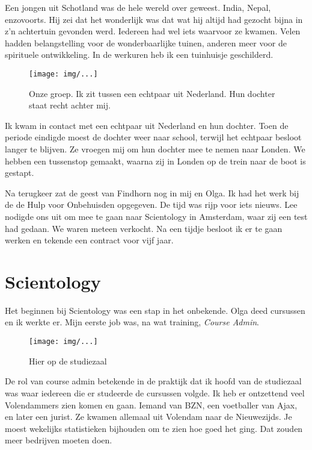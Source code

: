 \documentclass[10pt,twoside,openright]{memoir}
\begin{document}
Een jongen uit Schotland was de hele wereld over geweest. India, Nepal, enzovoorts. Hij zei dat het wonderlijk was dat wat hij altijd had gezocht bijna in z’n achtertuin gevonden werd. Iedereen had wel iets waarvoor ze kwamen. Velen hadden belangstelling voor de wonderbaarlijke tuinen, anderen meer voor de spirituele ontwikkeling. In de werkuren heb ik een tuinhuisje geschilderd. 

\begin{figure}[t]
\texttt{[image: img/...]}
\caption{Onze groep. Ik zit tussen een echtpaar uit Nederland. Hun dochter staat recht achter mij.}
\end{figure}

Ik kwam in contact met een echtpaar uit Nederland en hun dochter. Toen de periode eindigde moest de dochter weer naar school, terwijl het echtpaar besloot langer te blijven. Ze vroegen mij om hun dochter mee te nemen naar Londen. We hebben een tussenstop gemaakt, waarna zij in Londen op de trein naar de boot is gestapt.

Na terugkeer zat de geest van Findhorn nog in mij en Olga. Ik had het werk bij de de Hulp voor Onbehuisden opgegeven. De tijd was rijp voor iets nieuws. Lee nodigde ons uit om mee te gaan naar Scientology in Amsterdam, waar zij een test had gedaan. We waren meteen verkocht. Na een tijdje besloot ik er te gaan werken en tekende een contract voor vijf jaar. 

\chapter{Scientology} %
\label{cha:scientologu}

Het beginnen bij Scientology was een stap in het onbekende. Olga deed cursussen en ik werkte er. Mijn eerste job was, na wat training, \emph{Course Admin}. 

\begin{figure}[t]
\texttt{[image: img/...]}
\caption{Hier op de studiezaal}
\end{figure}

De rol van course admin betekende in de praktijk dat ik hoofd van de studiezaal was waar iedereen die er studeerde de cursussen volgde. Ik heb er ontzettend veel Volendammers zien komen en gaan. Iemand van BZN, een voetballer van Ajax, en later een jurist. Ze kwamen allemaal uit Volendam naar de Nieuwezijds. Je moest wekelijks statistieken bijhouden om te zien hoe goed het ging. Dat zouden meer bedrijven moeten doen.
\end{document}

